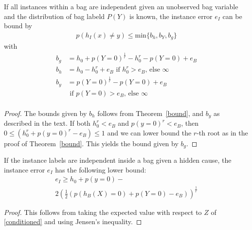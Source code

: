 \begin{theorema}
    If all instances within a bag are independent given an unobserved bag variable and the distribution of
    bag labeld $P(Y)$ is known, the instance error $e_I$ can
    be bound by
\begin{align}
    p(h_I(x)\neq y) \leq \text{min}\{ b_h, b_Y, b_g \} 
\end{align}
with
\begin{align}
b_g &= h_0 + p(Y=0)^\frac{1}{r} - h_0^r - p(Y=0) + e_B  \\
b_h &= h_0 - h_0^r + e_B \text{\ if } h_0^r > e_B \text{, else }\infty \\
b_y &= p(Y=0)^\frac{1}{r} - p(Y=0) + e_B \\
&\text{\ if } p(Y=0) > e_B \text{, else }\infty \\
\end{align}
\begin{proof}
    The bounds given by $b_h$ follows from Theorem~\ref{bound}, and $b_y$ as described in the text.
    If both  $h_0^r < e_B$ and $p(y=0)^r < e_B$, then $0 \leq ( h_0^r + p(y=0)^r - e_B) \leq 1$ and
    we can lower bound the $r$-th root as in the proof of Theorem~\ref{bound}. This yields the bound given
    by $b_g$.
\end{proof}
\end{theorema}

\begin{theorema}
If the instance labels are independent inside a bag given a hidden cause, the instance
error $e_I$ has the following lower bound:
\begin{multline*}
e_I \geq h_0 + p(y=0) - \\
2 \left (\frac{1}{2} (p(h_B(X)=0) + p(Y=0) - e_B) \right)^\frac{1}{r}
\end{multline*}
\begin{proof}
    This follows from taking the expected value with respect to $Z$ of \eqref{conditioned} and using Jensen's
    inequality.
\end{proof}
\end{theorema}


